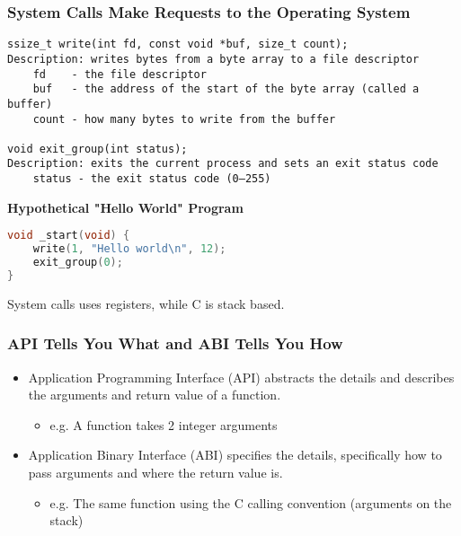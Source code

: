 \subsubsection{System Calls Make Requests to the Operating System}
\begin{definition}
\begin{verbatim}
ssize_t write(int fd, const void *buf, size_t count);
Description: writes bytes from a byte array to a file descriptor
    fd    - the file descriptor
    buf   - the address of the start of the byte array (called a buffer)
    count - how many bytes to write from the buffer

void exit_group(int status);
Description: exits the current process and sets an exit status code
    status - the exit status code (0–255)
\end{verbatim}    
\end{definition}

\begin{example}
    \textbf{Hypothetical "Hello World" Program}
\begin{lstlisting}[language=C]
void _start(void) {
    write(1, "Hello world\n", 12);
    exit_group(0);
}
\end{lstlisting}
\end{example}

\begin{warning}
    System calls uses registers, while C is stack based.
\end{warning}

\subsubsection{API Tells You What and ABI Tells You How}
\begin{definition}
    \begin{itemize}
        \item Application Programming Interface (API) abstracts the details and describes the arguments and return value of a function.
        \begin{itemize}
            \item e.g. A function takes 2 integer arguments
        \end{itemize}
        \item Application Binary Interface (ABI) specifies the details, specifically how to pass arguments and where the return value is.
        \begin{itemize}
            \item e.g. The same function using the C calling convention (arguments on the stack)
        \end{itemize}
    \end{itemize}
\end{definition}

